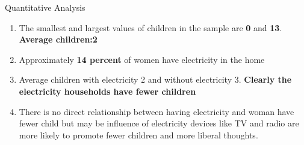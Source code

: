 \documentclass{beamer}
\begin{document}
\begin{frame}[t]{Quantitative Analysis}
	
	\begin{enumerate}
		\item The smallest and largest values of children in the sample are \textbf{ 0} and \textbf{ 13}. \textbf{Average children:2}
		
		\item Approximately\textbf{ 14 percent} of women have electricity in the home
		
		\item Average children with electricity 2 and without electricity 3.\textbf{ Clearly the electricity households have fewer children}
		\item There is no direct relationship between having electricity and woman have fewer child but may be influence of electricity devices like TV and radio are more likely to promote fewer children and more liberal thoughts.
		
	\end{enumerate}
	
	
\end{frame}
\end{document}
